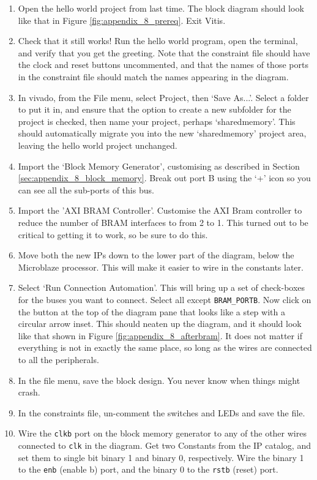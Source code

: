 \documentclass[../physical_computing.tex]{subfiles}
\begin{document}
\begin{enumerate}
    \item Open the hello world project from last time. The block diagram should look like that in Figure \ref{fig:appendix_8_prereq}. Exit Vitis.
    \item Check that it still works! Run the hello world program, open the terminal, and verify that you get the greeting. Note that the constraint file should have the clock and reset buttons uncommented, and that the names of those ports in the constraint file should match the names appearing in the diagram. 
    \item In vivado, from the File menu, select Project, then `Save As...'. Select a folder to put it in, and ensure that the option to create a new subfolder for the project is checked, then name your project, perhaps `sharedmemory'. This should automatically migrate you into the new `sharedmemory' project area, leaving the hello world project unchanged.
    \item Import the `Block Memory Generator', customising as described in Section \ref{sec:appendix_8_block_memory}. Break out port B using the `+' icon so you can see all the sub-ports of this bus.
    \item Import the 'AXI BRAM Controller'. Customise the AXI Bram controller to reduce the number of BRAM interfaces to from 2 to 1. This turned out to be critical to getting it to work, so be sure to do this.
    \item Move both the new IPs down to the lower part of the diagram, below the Microblaze processor. This will make it easier to wire in the constants later.
    \item Select `Run Connection Automation'. This will bring up a set of check-boxes for the buses you want to connect. Select all except \texttt{BRAM\_PORTB}. Now click on the button at the top of the diagram pane that looks like a step with a circular arrow inset. This should neaten up the diagram, and it should look like that shown in Figure \ref{fig:appendix_8_afterbram}. It does not matter if everything is not in exactly the same place, so long as the wires are connected to all the peripherals. 
    \item In the file menu, save the block design. You never know when things might crash.
    \item In the constraints file, un-comment the switches and LEDs and save the file. 
    \item Wire the \texttt{clkb} port on the block memory generator to any of the other wires connected to \texttt{clk} in the diagram. Get two Constants from the IP catalog, and set them to single bit binary 1 and binary 0, respectively. Wire the binary 1 to the \texttt{enb} (enable b) port, and the binary 0 to the \texttt{rstb} (reset) port.

\end{enumerate}
\end{document}
